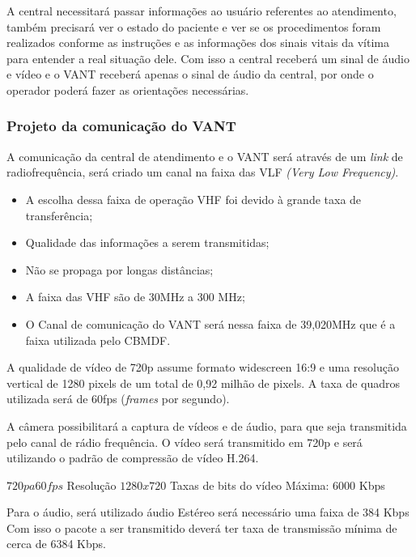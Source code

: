 A central necessitará passar informações ao usuário referentes ao atendimento, também precisará ver o estado do paciente e ver se os 
procedimentos foram realizados conforme as instruções e as informações dos sinais vitais da vítima para entender a real situação dele. 
Com isso a central receberá um sinal de áudio e vídeo e o VANT receberá apenas o sinal de áudio da central, por onde o operador poderá
fazer as orientações necessárias.

\subsubsection{Projeto da comunicação do VANT}
A comunicação da central de atendimento e o VANT será através de um \textit{link} de radiofrequência, será criado um canal na faixa das VLF
\textit{(Very Low Frequency)}.

\begin{itemize}
	\item  A escolha dessa faixa de operação VHF foi devido à grande taxa de transferência;
	\item Qualidade das informações a serem transmitidas;
	\item Não se propaga por longas distâncias;
	\item A faixa das VHF são de 30MHz a 300 MHz;
	\item  O Canal de comunicação do VANT será nessa faixa de 39,020MHz que é a faixa utilizada pelo CBMDF.
\end{itemize}


A qualidade de vídeo de 720p assume formato widescreen 16:9 e uma resolução vertical de 1280 pixels de um total de 0,92 milhão de pixels. 
A taxa de quadros utilizada será de 60fps (\textit{frames} por segundo). 

A câmera possibilitará a captura de vídeos e de áudio, para que seja transmitida pelo canal de rádio frequência. O vídeo será transmitido em 
720p e será utilizando o padrão de compressão de vídeo H.264.

\begin{center}
 $720p a 60 fps$
  Resolução
  $1280 x 720$
  Taxas de bits do vídeo
  Máxima: 6000 Kbps
\end{center}

Para o áudio, será utilizado áudio Estéreo será necessário uma faixa de 384 Kbps
Com isso o pacote a ser transmitido deverá ter taxa de transmissão mínima de cerca de 6384 Kbps. \footnotemark

